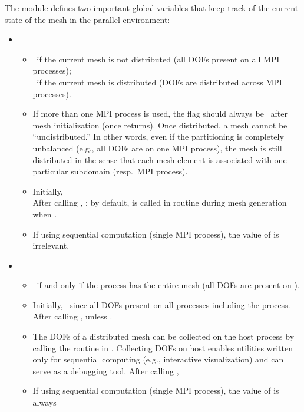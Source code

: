 The  module defines two important global variables that keep track of the current state of the mesh in the parallel environment:
\begin{itemize}
	\item {}
	\begin{itemize} \itemsep 2pt
		\item {}~if the current mesh is not distributed (all DOFs present on all MPI processes);\\
		~if the current mesh is distributed (DOFs are distributed across MPI processes).
		\item If more than one MPI process is used, the  flag should always be \ after mesh initialization (once  returns). Once distributed, a mesh cannot be ``undistributed.'' In other words, even if the partitioning is completely unbalanced (e.g., all DOFs are on one MPI process), the mesh is still distributed in the sense that each mesh element is associated with one particular subdomain (resp.\ MPI process).
		\item Initially, \\
		After calling , ; by default,  is called in routine  during mesh generation when . 
		\item If using sequential computation (single MPI process), the value of  is irrelevant.
	\end{itemize}
	\item {}
	\begin{itemize} \itemsep 2pt
	\item {}~if and only if the  process has the entire mesh (all DOFs are present on ).
	\item Initially, \ since all DOFs present on all processes including the  process. After calling ,  unless .
	\item The DOFs of a distributed mesh can be collected on the host process by calling the  routine in . Collecting DOFs on host enables utilities written only for sequential computing (e.g., interactive visualization) and can serve as a debugging tool. After calling , 
	\item If using sequential computation (single MPI process), the value of  is always 
	\end{itemize}
\end{itemize}


